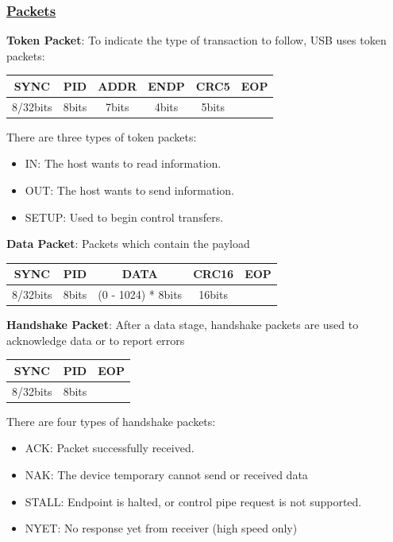 \documentclass[pdftex,10pt,a4paper]{report}
\newenvironment{packed_item}{
\begin{itemize}
  \setlength{\itemsep}{1pt}
  \setlength{\parskip}{0pt}
  \setlength{\parsep}{0pt}
}{\end{itemize}}
\begin{document}
\subsubsection{\underline{Packets}}
\begin{packed_item}
	\item \textbf{Token Packet}: To indicate the type of transaction to follow, USB uses token packets:
		\begin{center}
		\begin{tabular}{|c|c|c|c|c|c|}
  	\hline
  		SYNC & PID & ADDR & ENDP & CRC5 & EOP \\ \hline
  		8/32bits & 8bits & 7bits & 4bits & 5bits &  \\
  	\hline
  	\end{tabular}
  	\end{center}
  	
  	There are three types of token packets: 
  	\begin{itemize} \itemsep 0em
			\item IN: The host wants to read information.
			\item OUT: The host wants to send information.
			\item SETUP: Used to begin control transfers.
  	\end{itemize}
  	
  	
	\item \textbf{Data Packet}: Packets which contain the payload
		\begin{center}
		\begin{tabular}{|c|c|c|c|c|}
  	\hline
  		SYNC & PID & DATA & CRC16 & EOP \\ \hline
  		8/32bits & 8bits & (0 - 1024) * 8bits & 16bits &   \\
  	\hline
  	\end{tabular}
  	\end{center}
  	
  	
	\item \textbf{Handshake Packet}: After a data stage, handshake packets are used to acknowledge data or to report errors
		\begin{center}
		\begin{tabular}{|c|c|c|}
  	\hline
  		SYNC & PID & EOP \\ \hline
  		8/32bits & 8bits &  \\
  	\hline
  	\end{tabular}
  	\end{center}
  	
  	There are four types of handshake packets:
  	\begin{itemize} \itemsep 0em
			\item ACK: Packet successfully received.
			\item NAK: The device temporary cannot send or received data
			\item STALL: Endpoint is halted, or control pipe request is not supported.
			\item NYET: No response yet from receiver (high speed only)
  	\end{itemize}
  	

\end{packed_item}
\end{document}
